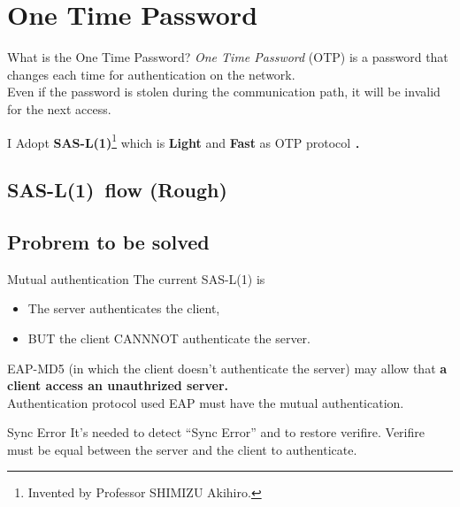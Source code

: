 \section{One Time Password}
\toc
\begin{frame}[c]{\fft}
    \begin{block}{What is the One Time Password?}
        \textit{One Time Password} (OTP) is a password that changes each time for authentication on the network.\\
        Even if the password is stolen during the communication path, it will be invalid for the next access.
    \end{block}
    \vfill
    I Adopt \textbf{\color{red} SAS-L(1)}\footnote{Invented by Professor SHIMIZU Akihiro.} which is \textbf{Light} and \textbf{Fast} as OTP protocol ．
\end{frame}
\subsection{SAS-L(1)\ flow (Rough)}
\begin{frame}{\ft}
    
\end{frame}
\subsection{Probrem to be solved}
\begin{frame}[t]{\ft}
    \begin{alertblock}{Mutual authentication\hfill\textbf{}}
        The current SAS-L(1) is
        \begin{itemize}
            \item The server authenticates the client,
            \item BUT the client CANNNOT authenticate the server.
        \end{itemize}
        EAP-MD5 (in which the client doesn't authenticate the server) may allow that
        \textbf{a client access an unauthrized server.}\\
        Authentication protocol used EAP must have the mutual authentication.
    \end{alertblock}
    \begin{alertblock}{Sync Error\hfill\textbf{}}
        It's needed to detect ``Sync Error'' and to restore verifire.
        Verifire must be equal between the server and the client to authenticate.
    \end{alertblock}
\end{frame}